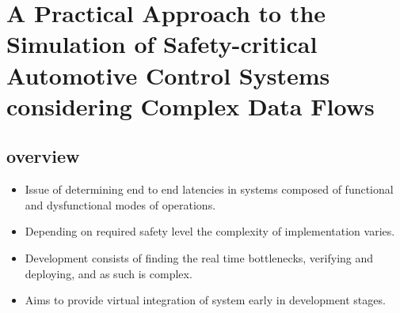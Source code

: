 \section{A Practical Approach to the Simulation of Safety-critical Automotive Control Systems considering Complex Data Flows}

\subsection*{overview}
\begin{itemize}
	\item Issue of determining end to end latencies in systems composed of functional and dysfunctional modes of operations.
	\item Depending on required safety level the complexity of implementation varies.
	\item Development consists of finding the real time bottlenecks, verifying and deploying, and as such is complex.
	\item Aims to provide virtual integration of system early in development stages.
\end{itemize}
